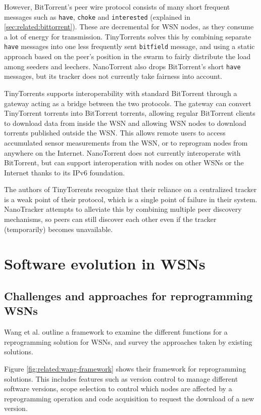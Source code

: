 However, BitTorrent's peer wire protocol consists of many short frequent messages such as \texttt{have}, \texttt{choke} and \texttt{interested} (explained in \ref{sec:related:bittorrent}). These are decremental for \gls{WSN} nodes, as they consume a lot of energy for transmission. TinyTorrents solves this by combining separate \texttt{have} messages into one less frequently sent \texttt{bitfield} message, and using a static approach based on the peer's position in the swarm to fairly distribute the load among \glspl{seeder} and \glspl{leecher}. NanoTorrent also drops BitTorrent's short \texttt{have} messages, but its tracker does not currently take fairness into account.

TinyTorrents supports interoperability with standard BitTorrent through a gateway acting as a bridge between the two protocols. The gateway can convert TinyTorrent torrents into BitTorrent torrents, allowing regular BitTorrent clients to download data from inside the \gls{WSN} and allowing \gls{WSN} nodes to download torrents published outside the \gls{WSN}. This allows remote users to access accumulated sensor measurements from the \gls{WSN}, or to reprogram nodes from anywhere on the Internet. NanoTorrent does not currently interoperate with BitTorrent, but can support interoperation with nodes on other \glspl{WSN} or the Internet thanks to its \gls{IPv6} foundation.

The authors of TinyTorrents recognize that their reliance on a centralized tracker is a weak point of their protocol, which is a single point of failure in their system. NanoTracker attempts to alleviate this by combining multiple peer discovery mechanisms, so peers can still discover each other even if the tracker (temporarily) becomes unavailable.

\section{Software evolution in WSNs}
\label{sec:related:evolution}

\subsection{Challenges and approaches for reprogramming WSNs}
Wang et al. \cite{wang-reprogramming} outline a framework to examine the different functions for a reprogramming solution for \glspl{WSN}, and survey the approaches taken by existing solutions.

Figure \ref{fig:related:wang-framework} shows their framework for reprogramming solutions. This includes features such as version control to manage different software versions, scope selection to control which nodes are affected by a reprogramming operation and code acquisition to request the download of a new version.

